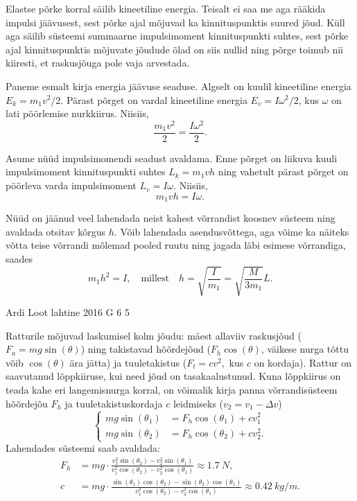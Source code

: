 \documentclass[11pt, twoside]{article}
\begin{document}
{{\ifSolution
Elastse põrke korral säilib kineetiline energia. Teisalt ei saa me aga rääkida impulsi jäävusest, sest põrke ajal mõjuvad ka kinnituspunktis suured jõud. Küll aga säilib süsteemi summaarne impulsimoment kinnituspunkti suhtes, sest põrke ajal kinnituspunktis mõjuvate jõudude õlad on siis nullid ning põrge toimub nii kiiresti, et raskusjõuga pole vaja arvestada.

Paneme esmalt kirja energia jäävuse seaduse. Algselt on kuulil kineetiline energia $E_k=m_1v^2/2$. Pärast põrget on vardal kineetiline energia $E_v=I\omega^2/2$, kus $\omega$ on lati pöörlemise nurkkiirus. Niisiis,
\[
\frac{m_1v^2}{2}=\frac{I\omega^2}{2}.
\]

Asume nüüd impulsimomendi seadust avaldama. Enne põrget on liikuva kuuli impulsimoment kinnituspunkti suhtes $L_k=m_1vh$ ning vahetult pärast põrget on pöörleva varda impulsimoment $L_v=I\omega$. Niisiis,
\[
m_1vh=I\omega.
\]

Nüüd on jäänud veel lahendada neist kahest võrrandist koosnev süsteem ning avaldada otsitav kõrgus $h$. Võib lahendada asendusvõttega, aga võime ka näiteks võtta teise võrrandi mõlemad pooled ruutu ning jagada läbi esimese võrrandiga, saades
\[
m_1h^2 = I,\quad \text{millest} \quad h = \sqrt{\frac{I}{m_1}}=\sqrt{\frac{M}{3m_1}}L.
\]
\fi
}

{Ardi Loot} %
{lahtine} %
{2016} %
{G 6} %
{5} %
{

\ifSolution
Ratturile mõjuvad laskumisel kolm jõudu: mäest allaviiv raskusjõud
($F_{a}=mg\sin(\theta)$) ning takistavad hõõrdejõud ($F_{h}\cos(\theta)$, väikese nurga tõttu võib $\cos(\theta)$ ära jätta)
ja tuuletakistus ($F_{t}=cv^{2},$ kus $c$ on kordaja). Rattur on
saavutanud lõppkiiruse, kui need jõud on tasakaalustunud. Kuna lõppkiirus
on teada kahe eri langemisnurga korral, on võimalik kirja panna võrrandisüsteem
hõõrdejõu $F_{h}$ ja tuuletakistuskordaja $c$ leidmiseks ($v_{2}=v_{1}-\Delta v$) 
\[
\begin{cases}
mg\sin(\theta_{1})&=F_{h}\cos(\theta_1)+cv_{1}^{2}\\
mg\sin(\theta_{2})&=F_{h}\cos(\theta_2)+cv_{2}^{2}.
\end{cases}
\]
Lahendades süsteemi saab avaldada:
\begin{align*}
F_{h} & = mg\cdot\frac{v_{1}^{2}\sin(\theta_{2})-v_{2}^{2}\sin(\theta_{1})}{v_{1}^{2}\cos(\theta_2)-v_{2}^{2}\cos(\theta_1)}\approx\SI{1.7}{N},\\[7pt] 
c & = mg\cdot\frac{\sin(\theta_{1})\cos(\theta_2)-\sin(\theta_{2})\cos(\theta_1)}{v_{1}^{2}\cos(\theta_2)-v_{2}^{2}\cos(\theta_1)}\approx\SI{0.42}{kg/m}.
\end{align*}

}}
\end{document}
